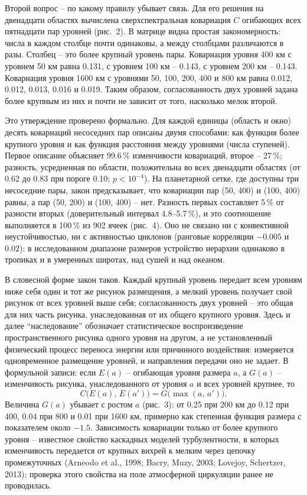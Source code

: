 \documentclass[12pt,a4paper]{article}
\begin{document}
Второй вопрос -- по какому правилу убывает связь. Для его решения на двенадцати областях вычислена сверхспектральная ковариация $C$ огибающих всех пятнадцати пар уровней (рис.~2). В матрице видна простая закономерность: числа в каждом столбце почти одинаковы, а между столбцами различаются в разы. Столбец -- это более крупный уровень пары. Ковариация уровня 400 км с уровнем 50 км равна 0.131, с уровнем 100 км -- 0.143, с уровнем 200 км -- 0.143. Ковариация уровня 1600 км с уровнями 50, 100, 200, 400 и 800 км равна 0.012, 0.012, 0.013, 0.016 и 0.019. Таким образом, согласованность двух уровней задана более крупным из них и почти не зависит от того, насколько мелок второй.

Это утверждение проверено формально. Для каждой единицы (область и окно) десять ковариаций несоседних пар описаны двумя способами: как функция более крупного уровня и как функция расстояния между уровнями (числа ступеней). Первое описание объясняет 99.6\,\% изменчивости ковариаций, второе -- 27\,\%; разность, усредненная по области, положительна во всех двенадцати областях (от 0.62 до 0.83 при пороге 0.10; $p < 10^{-4}$). На планетарной сетке, где доступны три несоседние пары, закон предсказывает, что ковариации пар (50, 400) и (100, 400) равны, а пар (50, 200) и (100, 400) -- нет. Разность первых составляет 5\,\% от разности вторых (доверительный интервал 4.8--5.7\,\%), и это соотношение выполняется в 100\,\% из 902 ячеек (рис.~4). Оно не связано ни с конвективной неустойчивостью, ни с активностью циклонов (ранговые корреляции $-0.005$ и $0.02$): в исследованном диапазоне размеров устройство иерархии одинаково в тропиках и в умеренных широтах, над сушей и над океаном.

В словесной форме закон таков. Каждый крупный уровень передает всем уровням ниже себя один и тот же рисунок размещения, а мелкий уровень получает свой рисунок от всех уровней выше себя; согласованность двух уровней -- это общая для них часть рисунка, унаследованная от их общего крупного уровня. Здесь и далее “наследование” обозначает статистическое воспроизведение пространственного рисунка одного уровня на другом, а не установленный физический процесс переноса энергии или причинного воздействия: измеряется одновременное размещение уровней, и направления передачи оно не задает. В формульной записи: если $E(a)$ -- огибающая уровня размера $a$, а $G(a)$ -- изменчивость рисунка, унаследованного от уровня $a$ и всех уровней крупнее, то
\begin{equation}
C\bigl(E(a),\,E(a')\bigr) = G\bigl(\max(a,\,a')\bigr).
\label{eq:law}
\end{equation}
Величина $G(a)$ убывает с ростом $a$ (рис.~3): от 0.25 при 200 км до 0.12 при 400, 0.04 при 800 и 0.01 при 1600 км, примерно как степенная функция размера с показателем около $-1.5$. Зависимость ковариации только от более крупного уровня -- известное свойство каскадных моделей турбулентности, в которых изменчивость передается от крупных вихрей к мелким через цепочку промежуточных (Arneodo et al., 1998; Bacry, Muzy, 2003; Lovejoy, Schertzer, 2013); проверка этого свойства на поле атмосферной циркуляции ранее не проводилась.
\end{document}
